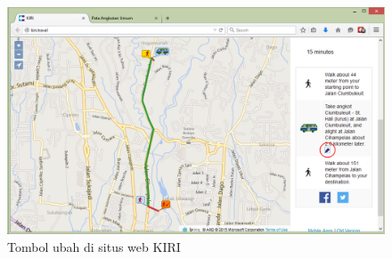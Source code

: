 \begin{figure}
	\centering
	\includegraphics[scale=0.5]{Gambar/4_tombolubah}
	\caption{Tombol ubah di situs web KIRI} 
	\label{fig:4_tombolubah}
\end{figure}